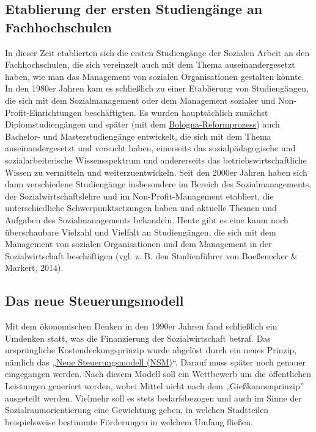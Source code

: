 \documentclass[
  letterpaper,
]{book}
\begin{document}
\subsection{Etablierung der ersten Studiengänge an
Fachhochschulen}\label{fachhochschulen}

In dieser Zeit etablierten sich die ersten Studiengänge der Sozialen
Arbeit an den Fachhochschulen, die sich vereinzelt auch mit dem Thema
auseinandergesetzt haben, wie man das Management von sozialen
Organisationen gestalten könnte. In den 1980er Jahren kam es schließlich
zu einer Etablierung von Studiengängen, die sich mit dem
Sozialmanagement oder dem Management sozialer und
Non-Profit-Einrichtungen beschäftigten. Es wurden hauptsächlich zunächst
Diplomstudiengängen und später (mit dem
\href{https://de.wikipedia.org/wiki/Bologna-Prozess}{Bologna-Reformprozess})
auch Bachelor- und Masterstudiengänge entwickelt, die sich mit dem Thema
auseinandergesetzt und versucht haben, einerseits das sozialpädagogische
und sozialarbeiterische Wissensspektrum und andererseits das
betriebswirtschaftliche Wissen zu vermitteln und weiterzuentwickeln.
Seit den 2000er Jahren haben sich dann verschiedene Studiengänge
insbesondere im Bereich des Sozialmanagements, der
Sozialwirtschaftslehre und im Non-Proﬁt-Management etabliert, die
unterschiedliche Schwerpunktsetzungen haben und aktuelle Themen und
Aufgaben des Sozialmanagements behandeln. Heute gibt es eine kaum noch
überschaubare Vielzahl und Vielfalt an Studiengängen, die sich mit dem
Management von sozialen Organisationen und dem Management in der
Sozialwirtschaft beschäftigen (vgl. z. B. den Studienführer von
Boeßenecker \& Markert, 2014).

\subsection{Das neue Steuerungsmodell}\label{steuerungsmodell}

Mit dem ökonomischen Denken in den 1990er Jahren fand schließlich ein
Umdenken statt, was die Finanzierung der Sozialwirtschaft betraf. Das
ursprüngliche Kostendeckungsprinzip wurde abgelöst durch ein neues
Prinzip, nämlich das
„\href{https://de.wikipedia.org/wiki/Neues_Steuerungsmodell}{Neue
Steuerungsmodell (NSM)}``. Darauf muss später noch genauer eingegangen
werden. Nach diesem Modell soll ein Wettbewerb um die öffentlichen
Leistungen generiert werden, wobei Mittel nicht nach dem
„Gießkannenprinzip'' ausgeteilt werden. Vielmehr soll es stets
bedarfsbezogen und auch im Sinne der Sozialraumorientierung eine
Gewichtung geben, in welchen Stadtteilen beispielsweise bestimmte
Förderungen in welchem Umfang fließen.
\end{document}
